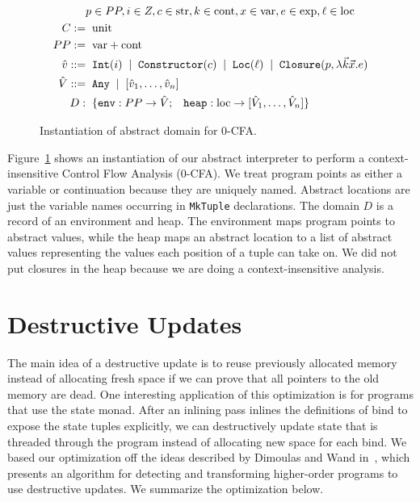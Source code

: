 \documentclass{article}
\begin{document}
\begin{figure}
\begin{align*}
& p \in PP, i \in Z, c \in \text{str}, k \in \text{cont}, x \in \text{var}, e \in \text{exp}, \ell \in \text{loc} \\
C := & \;\; \text{unit} \\
PP := & \;\; \text{var} + \text{cont} \\
\hat{v} ::= & \;\; \texttt{Int}(i) \;\; | \;\; \texttt{Constructor}(c) \;\; | \;\; \texttt{Loc}(\ell) \;\; | \;\; \texttt{Closure}(p, \lambda \vec{k} \vec{x}. e) \\
\hat{V}::= & \;\; \texttt{Any} \;\; | \;\; [\hat{v}_1, \hdots, \hat{v}_n] \\
D: & \;\; \{{\tt env}: PP \rightarrow \hat{V} ; \;\;\; {\tt heap}: \text{loc} \rightarrow [\hat{V}_1, \hdots, \hat{V}_n] \}
\end{align*}
\caption{Instantiation of abstract domain for 0-CFA.}
\label{fig:cfa0}
\end{figure}
Figure~\ref{fig:cfa0} shows an instantiation of our abstract interpreter to perform a context-insensitive Control Flow Analysis (0-CFA). We treat program points as either a variable or continuation because they are uniquely named. Abstract locations are just the variable names occurring in {\tt MkTuple} declarations. The domain $D$ is a record of an environment and heap. The environment maps program points to abstract values, while the heap maps an abstract location to a list of abstract values representing the values each position of a tuple can take on. We did not put closures in the heap because we are doing a context-insensitive analysis. 

\section{Destructive Updates}
\label{sec:destructive-updates}

The main idea of a destructive update is to reuse previously allocated memory instead of allocating fresh space if we can prove that all pointers to the old memory are dead. One interesting application of this optimization is for programs that use the state monad. After an inlining pass inlines the definitions of bind to expose the state tuples explicitly, we can destructively update state that is threaded through the program instead of allocating new space for each bind. We based our optimization off the ideas described by Dimoulas and Wand in~\cite{dimoulas2009higher}, which presents an algorithm for detecting and transforming higher-order programs to use destructive updates. We summarize the optimization below. 
\end{document}
